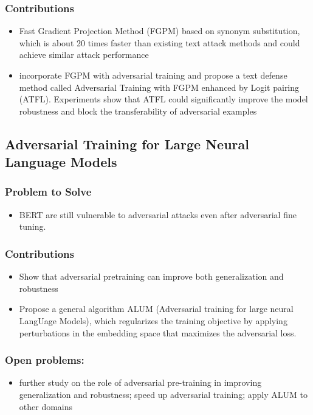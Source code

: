 \documentclass{article}
\begin{document}
\begin{flushleft}
\subsubsection*{Contributions}
\begin{itemize}
  \item Fast Gradient Projection Method (FGPM) based on synonym substitution, which is about 20 times faster than existing text attack methods and could achieve similar attack performance
  \item incorporate FGPM with adversarial training and propose a text defense method called Adversarial Training with FGPM enhanced by Logit pairing (ATFL). Experiments show that ATFL could significantly improve the model robustness and block the transferability of adversarial examples
\end{itemize}


 



\subsection{ Adversarial Training for Large Neural Language Models \cite{liu2020adversarial}} 
\subsubsection*{Problem to Solve}
\begin{itemize}
    \item BERT are still vulnerable to adversarial attacks even after adversarial fine tuning.
\end{itemize}

\subsubsection*{Contributions}
\begin{itemize}
 \item Show that adversarial pretraining can improve both generalization and robustness
\item Propose a general algorithm ALUM (Adversarial training for large neural LangUage Models), which regularizes the training objective by applying perturbations in the embedding space that maximizes the adversarial loss.
\end{itemize}

\subsubsection*{Open problems:}
\begin{itemize}
  \item  further study on the role of adversarial pre-training in improving generalization and robustness; speed up adversarial training; apply ALUM to other domains
\end{itemize}





\end{flushleft}
\end{document}
